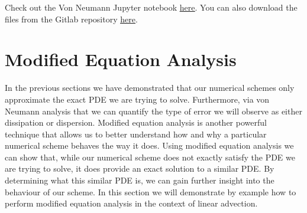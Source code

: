 \begin{jupyternote}
	Check out the Von Neumann Jupyter notebook \href{\binderurl}{\underline{here}}. You can also download the files from the Gitlab repository \href{\repourl}{\underline{here}}.
\end{jupyternote}
\chapter{Modified Equation Analysis}
In the previous sections we have demonstrated that our numerical schemes only approximate the exact PDE we are trying to solve. Furthermore, via von Neumann analysis that we can quantify the type of error we will observe as either dissipation or dispersion. Modified equation analysis is another powerful technique that allows us to better understand how and why a particular numerical scheme behaves the way it does. Using modified equation analysis we can show that, while our numerical scheme does not exactly satisfy the PDE we are trying to solve, it does provide an exact solution to a similar PDE. By determining what this similar PDE is, we can gain further insight into the behaviour of our scheme. In this section we will demonstrate by example how to perform modified equation analysis in the context of linear advection.

